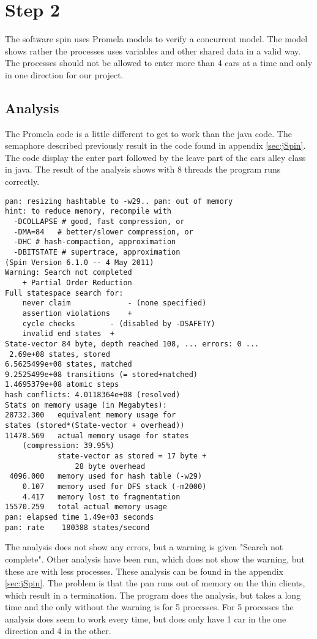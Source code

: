 \section{Step 2}
The software spin uses Promela models to verify a concurrent model. The model shows rather the processes uses variables and other shared data in a valid way. The processes should not be allowed to enter more than 4 cars at a time and only in one direction for our project.
\\

\subsection{Analysis}
The Promela code is a little different to get to work than the java code. The semaphore described previously result in the code found in appendix \ref{sec:jSpin}. The code display the enter part followed by the leave part of the cars alley class in java. The result of the analysis shows with 8 threads the program runs correctly. 

\begin{lstlisting}
pan: resizing hashtable to -w29.. pan: out of memory
hint: to reduce memory, recompile with
  -DCOLLAPSE # good, fast compression, or
  -DMA=84   # better/slower compression, or
  -DHC # hash-compaction, approximation
  -DBITSTATE # supertrace, approximation
(Spin Version 6.1.0 -- 4 May 2011)
Warning: Search not completed
	+ Partial Order Reduction
Full statespace search for:
	never claim         	- (none specified)
	assertion violations	+
	cycle checks       	- (disabled by -DSAFETY)
	invalid end states	+
State-vector 84 byte, depth reached 108, ... errors: 0 ...
 2.69e+08 states, stored
6.5625499e+08 states, matched
9.2525499e+08 transitions (= stored+matched)
1.4695379e+08 atomic steps
hash conflicts: 4.0118364e+08 (resolved)
Stats on memory usage (in Megabytes):
28732.300	equivalent memory usage for 
states (stored*(State-vector + overhead))
11478.569	actual memory usage for states 
    (compression: 39.95%)
         	state-vector as stored = 17 byte + 
         	    28 byte overhead
 4096.000	memory used for hash table (-w29)
    0.107	memory used for DFS stack (-m2000)
    4.417	memory lost to fragmentation
15570.259	total actual memory usage
pan: elapsed time 1.49e+03 seconds
pan: rate    180388 states/second
\end{lstlisting}

The analysis does not show any errors, but a warning is given "Search not complete". Other analysis have been run, which does not show the warning, but these are with less processes. These analysis can be found in the appendix \ref{sec:jSpin}. The problem is that the pan runs out of memory on the thin clients, which result in a termination. The program does the analysis, but takes a long time and the only without the warning is for 5 processes. For 5 processes the analysis does seem to work every time, but does only have 1 car in the one direction and 4 in the other.

